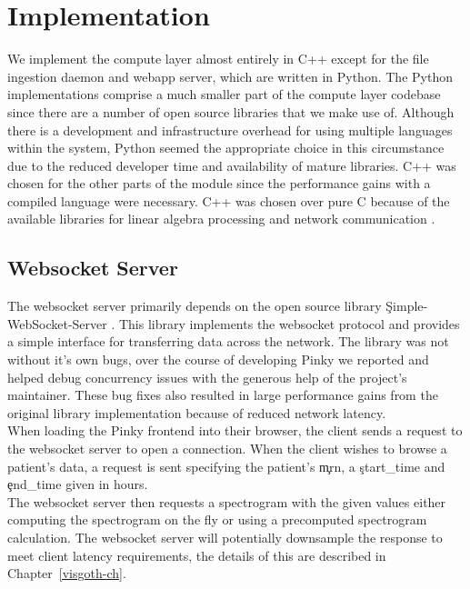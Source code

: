 \section{Implementation}

We implement the compute layer almost entirely in C++ except for the file
ingestion daemon and webapp server, which are written in Python. The Python
implementations comprise a much smaller part of the compute layer codebase
since there are a number of open source libraries that we make use of. Although
there is a development and infrastructure overhead for using multiple languages
within the system, Python seemed the appropriate choice in this circumstance
due to the reduced developer time and availability of mature libraries. C++ was
chosen for the other parts of the module since the performance gains with a
compiled language were necessary. C++ was chosen over pure C because of the
available libraries for linear algebra processing \cite{arma} and network
communication \cite{websocket-server}.

\subsection{Websocket Server}\label{compute-ch:implementation-ws-server}

The websocket server primarily depends on the open source library
\c{Simple-WebSocket-Server} \cite{websocket-server}. This library implements
the websocket protocol and provides a simple interface for transferring data
across the network. The library was not without it's own bugs, over the course
of developing Pinky we reported and helped debug concurrency issues with the
generous help of the project's maintainer. These bug fixes also resulted in
large performance gains from the original library implementation because of
reduced network latency. \\

When loading the Pinky frontend into their browser, the client sends a request
to the websocket server to open a connection. When the client wishes to browse
a patient's data, a request is sent specifying the patient's \c{mrn}, a
\c{start\_time} and \c{end\_time} given in hours. \\

The websocket server then requests a spectrogram with the given values either
computing the spectrogram on the fly or using a precomputed spectrogram
calculation. The websocket server will potentially downsample the response to
meet client latency requirements, the details of this are described in
Chapter~\ref{visgoth-ch}. \\

